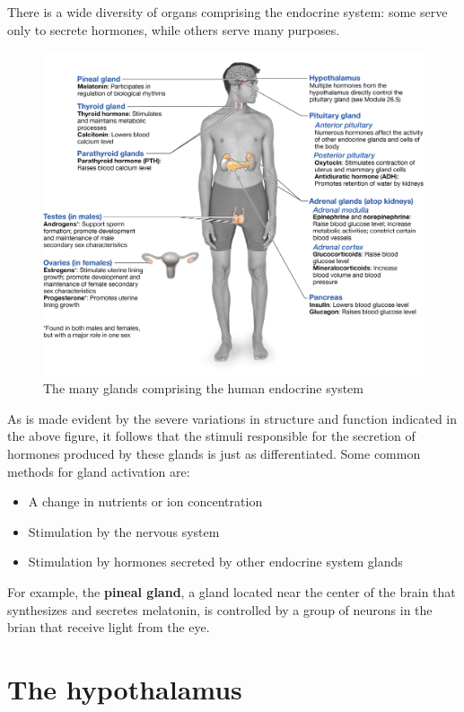 \documentclass{article}
\begin{document}
There is a wide diversity of organs comprising the endocrine system: some serve
only to secrete hormones, while others serve many purposes.

\begin{figure}[h]
	\centering
	\includegraphics[width=1\linewidth]{testonsterone_sucks_honestly.png}
	\caption{The many glands comprising the human endocrine system}
\end{figure}

As is made evident by the severe variations in structure and function indicated
in the above figure, it follows that the stimuli responsible for the secretion
of hormones produced by these glands is just as differentiated. Some common methods
for gland activation are:

\begin{itemize}
	\item A change in nutrients or ion concentration
	\item Stimulation by the nervous system
	\item Stimulation by hormones secreted by other endocrine system glands
\end{itemize}

For example, the \textbf{pineal gland}, a gland located near the center of
the brain that synthesizes and secretes melatonin, is controlled by a group of
neurons in the brian that receive light from the eye.

\section{The hypothalamus}
\end{document}
